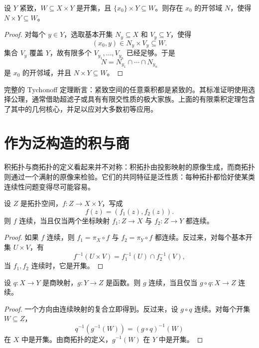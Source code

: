 \begin{lemma}[管状引理]
设 $Y$ 紧致，$W\subseteq X\times Y$ 是开集，且 $\{x_0\}\times Y\subseteq W$。则存在 $x_0$ 的开邻域 $N$，使得 $N\times Y\subseteq W$。
\end{lemma}

\begin{proof}
对每个 $y\in Y$，选取基本开集 $N_y\subseteq X$ 和 $V_y\subseteq Y$，使得
\[
    (x_0,y)\in N_y\times V_y\subseteq W.
\]
集合 $V_y$ 覆盖 $Y$，故有限多个 $V_{y_1},\dots,V_{y_n}$ 已经足够。于是
\[
    N=N_{y_1}\cap\cdots\cap N_{y_n}
\]
是 $x_0$ 的开邻域，并且 $N\times Y\subseteq W$。
\end{proof}

\begin{remark}
完整的 Tychonoff 定理断言：紧致空间的任意乘积都是紧致的。其标准证明使用选择公理，通常借助超滤子或具有有限交性质的极大家族。上面的有限乘积定理包含了其中的几何核心，并足以应对大多数初等应用。
\end{remark}

\section{作为泛构造的积与商}

积拓扑与商拓扑的定义看起来并不对称：积拓扑由投影映射的原像生成，而商拓扑则通过一个满射的原像来检验。它们的共同特征是泛性质：每种拓扑都恰好使某类连续性问题变得尽可能容易。

\begin{theorem}[积的泛性质]
设 $Z$ 是拓扑空间，$f:Z\to X\times Y$，写成
\[
    f(z)=(f_1(z),f_2(z)).
\]
则 $f$ 连续，当且仅当两个坐标映射 $f_1:Z\to X$ 与 $f_2:Z\to Y$ 都连续。
\end{theorem}

\begin{proof}
如果 $f$ 连续，则 $f_1=\pi_X\circ f$ 与 $f_2=\pi_Y\circ f$ 都连续。反过来，对每个基本开集 $U\times V$，有
\[
    f^{-1}(U\times V)=f_1^{-1}(U)\cap f_2^{-1}(V),
\]
当 $f_1,f_2$ 连续时，它是开集。
\end{proof}

\begin{theorem}[商的泛性质]
设 $q:X\to Y$ 是商映射，$g:Y\to Z$ 是函数。则 $g$ 连续，当且仅当 $g\circ q:X\to Z$ 连续。
\end{theorem}

\begin{proof}
一个方向由连续映射的复合立即得到。反过来，设 $g\circ q$ 连续。对每个开集 $W\subseteq Z$，
\[
    q^{-1}(g^{-1}(W))=(g\circ q)^{-1}(W)
\]
在 $X$ 中是开集。由商拓扑的定义，$g^{-1}(W)$ 在 $Y$ 中是开集。
\end{proof}

